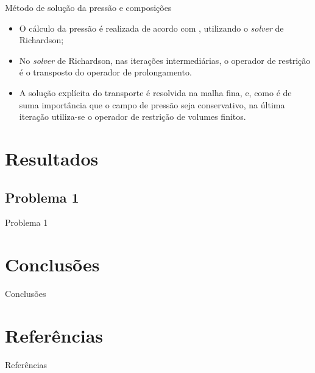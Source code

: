 \documentclass[professionalfont]{beamer}
\begin{document}
\begin{frame}{Método de solução da pressão e composições}

    \begin{itemize}
        \item O cálculo da pressão é realizada de acordo com , utilizando o \textit{solver} de Richardson;
        \item No \textit{solver} de Richardson, nas iterações intermediárias, o operador de restrição é o transposto do operador de prolongamento.
        \item A solução explícita do transporte é resolvida na malha fina, e, como é de suma importância que o campo de pressão seja conservativo, na última iteração utiliza-se o operador de restrição de volumes finitos. 
    \end{itemize}
    
\end{frame}

\section{Resultados}
\subsection{Problema 1}
\begin{frame}{Problema 1}
    
\end{frame}

\section{Conclusões}
\begin{frame}{Conclusões}
    
\end{frame}


\section{Referências}

\begin{frame}[allowframebreaks]{Referências}
    \scriptsize
    
\end{frame}
\end{document}
